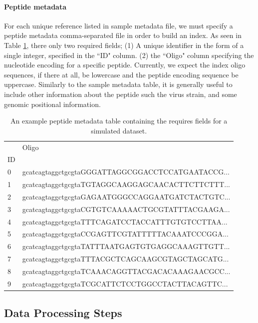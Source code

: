 \documentclass{article}
\begin{document}
\paragraph{Peptide metadata}
For each unique reference listed in sample metadata file, we must specify a peptide metadata comma-separated file in order to build an index. 
As seen in Table \ref{tab:peptide_metadata}, there only two required fields;
(1) A unique identifier in the form of a single integer, specified in the ``ID" column.
(2) the ``Oligo" column specifying the nucleotide encoding for a specific peptide. 
Currently, we expect the index oligo sequences, if there at all, be lowercase and the peptide encoding sequence be uppercase.
Similarly to the sample metadata table, it is generally useful to include other information about the peptide such the virus
strain, and some genomic positional information.

\begin{table}[h!!]
\centering
\begin{tabular}{ll}
\toprule
{} &                                              Oligo \\
ID &                                                    \\
\midrule
0  &  gcatcagtaggctgcgtaGGGATTAGGCGGACCTCCATGAATACCG... \\
1  &  gcatcagtaggctgcgtaTGTAGGCAAGGAGCAACACTTCTTCTTT... \\
2  &  gcatcagtaggctgcgtaGAGAATGGGCCAGGAATGATCTACTGTC... \\
3  &  gcatcagtaggctgcgtaCGTGTCAAAAACTGCGTATTTACGAAGA... \\
4  &  gcatcagtaggctgcgtaTTTCAGATCCTACCATTTGTGTCCTTAA... \\
5  &  gcatcagtaggctgcgtaCCGAGTTCGTATTTTTACAAATCCCGGA... \\
6  &  gcatcagtaggctgcgtaTATTTAATGAGTGTGAGGCAAAGTTGTT... \\
7  &  gcatcagtaggctgcgtaTTTACGCTCAGCAAGCGTAGCTAGCATG... \\
8  &  gcatcagtaggctgcgtaTCAAACAGGTTACGACACAAAGAACGCC... \\
9  &  gcatcagtaggctgcgtaTCGCATTCTCCTGGCCTACTTACAGTTC... \\
\bottomrule
\end{tabular}
\caption{An example peptide metadata table containing the requires fields for a simulated dataset.}
\label{tab:peptide_metadata}
\end{table}

\subsection*{Data Processing Steps}
\end{document}
